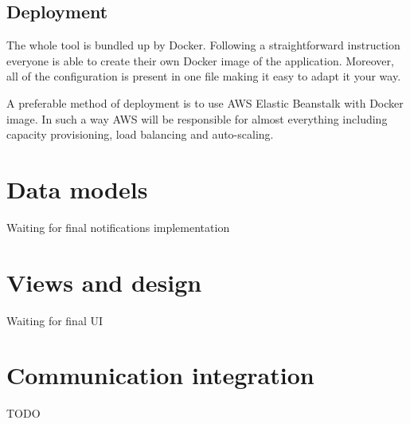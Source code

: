 \documentclass[licencjacka,en]{thesisclass}
\begin{document}
    \subsection{Deployment}

    The whole tool is bundled up by Docker.
    Following a straightforward instruction everyone is able to create their own Docker image of the application.
    Moreover, all of the configuration is present in one file making it easy to adapt it your way.

    A preferable method of deployment is to use AWS Elastic Beanstalk with Docker image.
    In such a way AWS will be responsible for almost everything including capacity provisioning, load balancing and auto-scaling.

    \section{Data models}
    Waiting for final notifications implementation
    \section{Views and design}
    Waiting for final UI
    \section{Communication integration}
    TODO
\end{document}
